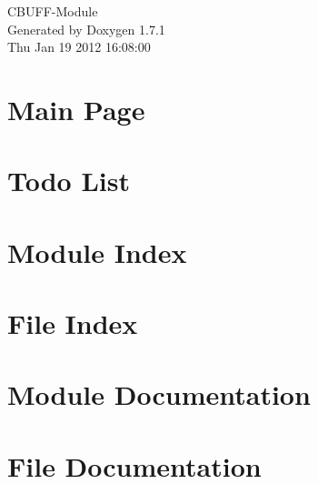 \documentclass[a4paper]{book}
\begin{document}
\hypersetup{pageanchor=false}
\begin{titlepage}
\vspace*{7cm}
\begin{center}
{\Large CBUFF-\/Module }\\
\vspace*{1cm}
{\large Generated by Doxygen 1.7.1}\\
\vspace*{0.5cm}
{\small Thu Jan 19 2012 16:08:00}\\
\end{center}
\end{titlepage}
\clearemptydoublepage
{}
\tableofcontents
\clearemptydoublepage
{}
\hypersetup{pageanchor=true}
\chapter{Main Page}
\label{index}\hypertarget{index}{}
\chapter{Todo List}
\label{todo}
\hypertarget{todo}{}

\chapter{Module Index}

\chapter{File Index}

\chapter{Module Documentation}









\chapter{File Documentation}


\printindex
\end{document}
